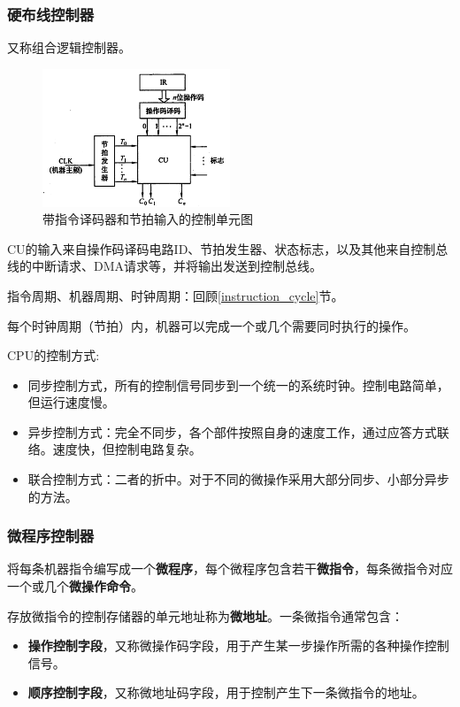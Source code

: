 \documentclass[12pt, a4paper, oneside]{ctexart}
\begin{document}
\subsubsection{硬布线控制器}

又称组合逻辑控制器。

\begin{figure}
  \centering
  \includegraphics[width=0.5\textwidth]{./images/cu_with_id_and_clock_input.png}
  \caption{带指令译码器和节拍输入的控制单元图}
\end{figure}

CU的输入来自操作码译码电路ID、节拍发生器、状态标志，以及其他来自控制总线的中断请求、DMA请求等，并将输出发送到控制总线。

指令周期、机器周期、时钟周期：回顾\ref{instruction_cycle}节。

每个时钟周期（节拍）内，机器可以完成一个或几个需要同时执行的操作。

CPU的控制方式:
\begin{itemize}
  \item 同步控制方式，所有的控制信号同步到一个统一的系统时钟。控制电路简单，但运行速度慢。
  \item 异步控制方式：完全不同步，各个部件按照自身的速度工作，通过应答方式联络。速度快，但控制电路复杂。
  \item 联合控制方式：二者的折中。对于不同的微操作采用大部分同步、小部分异步的方法。
\end{itemize}

\subsubsection{微程序控制器}

将每条机器指令编写成一个\textbf{微程序}，每个微程序包含若干\textbf{微指令}，每条微指令对应一个或几个\textbf{微操作命令}。

存放微指令的控制存储器的单元地址称为\textbf{微地址}。一条微指令通常包含：
\begin{itemize}
  \item {\bf 操作控制字段}，又称微操作码字段，用于产生某一步操作所需的各种操作控制信号。
  \item {\bf 顺序控制字段}，又称微地址码字段，用于控制产生下一条微指令的地址。
\end{itemize}
\end{document}
